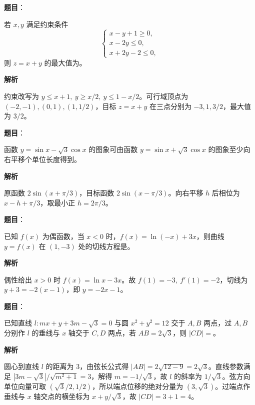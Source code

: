 \begin{answer}

\textbf{题目}：

若 \(x,y\) 满足约束条件
\nopagebreak[4]
\[
\begin{cases}
x-y+1\geq0,\\
x-2y\leq0,\\
x+2y-2\leq0,
\end{cases}
\]
则 \(z=x+y\) 的最大值为\gkblank{}。

\textbf{解析}

约束改写为 \(y\leq x+1,\ y\geq x/2,\ y\leq1-x/2\)。可行域顶点为 \((-2,-1),(0,1),(1,1/2)\)，目标 \(z=x+y\) 在三点分别为 \(-3,1,3/2\)，最大值为 \(3/2\)。


\end{answer}
\begin{answer}

\textbf{题目}：

函数 \(y=\sin x-\sqrt3\cos x\) 的图象可由函数 \(y=\sin x+\sqrt3\cos x\) 的图象至少向右平移\gkblank{}个单位长度得到。

\textbf{解析}

原函数 \(2\sin(x+\pi/3)\)，目标函数 \(2\sin(x-\pi/3)\)。向右平移 \(h\) 后相位为 \(x-h+\pi/3\)，取最小正 \(h=2\pi/3\)。


\end{answer}
\begin{answer}

\textbf{题目}：

已知 \(f(x)\) 为偶函数，当 \(x<0\) 时，\(f(x)=\ln(-x)+3x\)，则曲线 \(y=f(x)\) 在 \((1,-3)\) 处的切线方程是\gkblank{}。

\textbf{解析}

偶性给出 \(x>0\) 时 \(f(x)=\ln x-3x\)。故 \(f(1)=-3,\ f'(1)=-2\)，切线为 \(y+3=-2(x-1)\)，即 \(y=-2x-1\)。


\end{answer}
\begin{answer}

\textbf{题目}：

已知直线 \(l:mx+y+3m-\sqrt3=0\) 与圆 \(x^2+y^2=12\) 交于 \(A,B\) 两点，过 \(A,B\) 分别作 \(l\) 的垂线与 \(x\) 轴交于 \(C,D\) 两点，若 \(AB=2\sqrt3\)，则 \(|CD|=\)\gkblank{}。

\textbf{解析}

圆心到直线 \(l\) 的距离为 3，由弦长公式得 \(|AB|=2\sqrt{12-9}=2\sqrt3\)。直线参数满足 \(|3m-\sqrt3|/\sqrt{m^2+1}=3\)，解得 \(m=-1/\sqrt3\)，故 \(l\) 的斜率为 \(1/\sqrt3\)。弦方向单位向量可取 \((\sqrt3/2,1/2)\)，所以端点位移的绝对分量为 \((3,\sqrt3)\)。过端点作垂线与 \(x\) 轴交点的横坐标为 \(x+y/\sqrt3\)，故 \(|CD|=3+1=4\)。


\end{answer}
